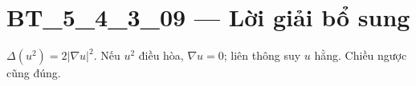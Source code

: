 \documentclass[10pt,a4paper]{article}
\begin{document}
\section*{BT\_5\_4\_3\_09 — Lời giải bổ sung}
$\Delta(u^2)=2|\nabla u|^2$. Nếu $u^2$ điều hòa, $\nabla u=0$; liên thông suy $u$ hằng. Chiều ngược cũng đúng.
\end{document}
